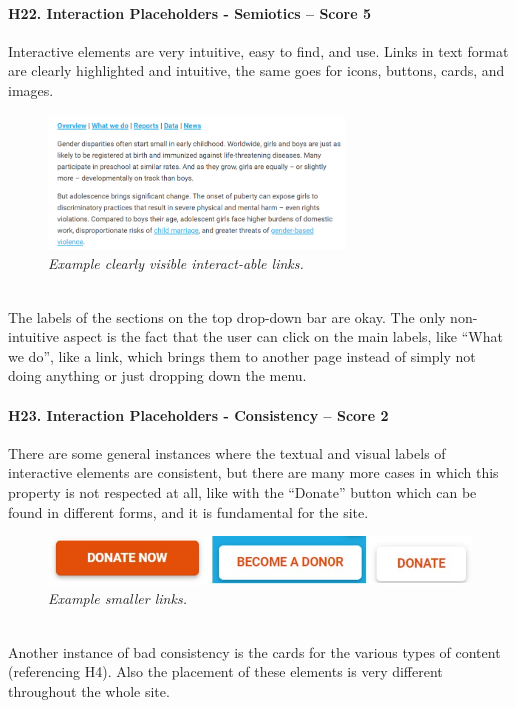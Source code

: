 \paragraph*{H22. Interaction Placeholders - Semiotics – Score 5}
Interactive elements are very intuitive, easy to find, and use. Links in text format are clearly highlighted and intuitive, the same goes for icons, buttons, cards, and images.
\begin{figure}[h]
	\centering
	\begin{center}
		\includegraphics[width=0.7\textwidth]{Picture22.png}
	\end{center}
	\captionsetup{font=small}
	\caption{\textit{Example clearly visible interact-able links.}}
	\label{fig:label22}
\end{figure}
\\
The labels of the sections on the top drop-down bar are okay. The only non-intuitive aspect is the fact that the user can click on the main labels, like “What we do”, like a link, which brings them to another page instead of simply not doing anything or just dropping down the menu.

\paragraph*{H23. Interaction Placeholders - Consistency – Score 2}
There are some general instances where the textual and visual labels of interactive elements are consistent, but there are many more cases in which this property is not respected at all, like with the “Donate” button which can be found in different forms, and it is fundamental for the site.
\begin{figure}[h]
	\includegraphics[width=\textwidth]{Picture23.jpg}
	\captionsetup{font=small}
	\caption{\textit{Example smaller links.}}
	\label{fig:label23}
\end{figure}
\\
Another instance of bad consistency is the cards for the various types of content (referencing H4). Also the placement of these elements is very different throughout the whole site.

